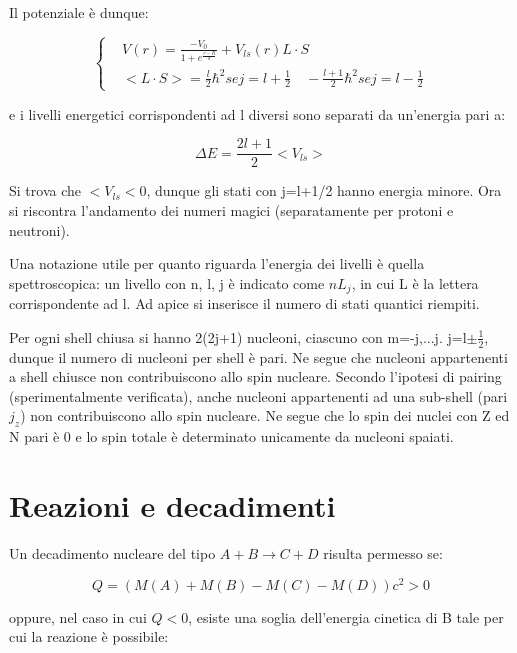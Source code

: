 \documentclass{article}
\begin{document}
Il potenziale è dunque:

\begin{equation}
    \left\{
    \begin{aligned}
         & V(r)=\frac{-V_0}{1+e^{\frac{r-R}{a}}}+V_{ls}(r)L\cdot S                                          \\
         & <L\cdot S>= \frac{l}{2}\hbar^2 se j=l+\frac{1}{2} \quad -\frac{l+1}{2}\hbar^2 se j=l-\frac{1}{2}
    \end{aligned}
    \right.
\end{equation}

e i livelli energetici corrispondenti ad l diversi sono separati da un'energia pari a:

\begin{equation}
    \Delta E= \frac{2l+1}{2}<V_{ls}>
\end{equation}

Si trova che $<V_{ls}<0$, dunque gli stati con j=l+1/2 hanno energia minore.
Ora si riscontra l'andamento dei numeri magici (separatamente per protoni e neutroni).

Una notazione utile per quanto riguarda l'energia dei livelli è quella spettroscopica:
un livello con n, l, j è indicato come $nL_j$, in cui L è la lettera corrispondente ad l.
Ad apice si inserisce il numero di stati quantici riempiti.

Per ogni shell chiusa si hanno 2(2j+1) nucleoni, ciascuno con m=-j,...j.
j=l$\pm \frac{1}{2}$, dunque il numero di nucleoni per shell è pari.
Ne segue che nucleoni appartenenti a shell chiusce non contribuiscono allo spin nucleare.
Secondo l'ipotesi di pairing (sperimentalmente verificata), anche nucleoni appartenenti ad una sub-shell (pari $j_z$) non contribuiscono allo spin nucleare.
Ne segue che lo spin dei nuclei con Z ed N pari è 0 e lo spin totale è determinato unicamente da nucleoni spaiati.


\section{Reazioni e decadimenti}

Un decadimento nucleare del tipo $A+B\rightarrow C+D$ risulta permesso se:

\begin{equation}
    Q=(M(A)+M(B)-M(C)-M(D))c^2>0
\end{equation}

oppure, nel caso in cui $Q<0$, esiste una soglia dell'energia cinetica di B tale per cui la reazione è possibile:
\end{document}
